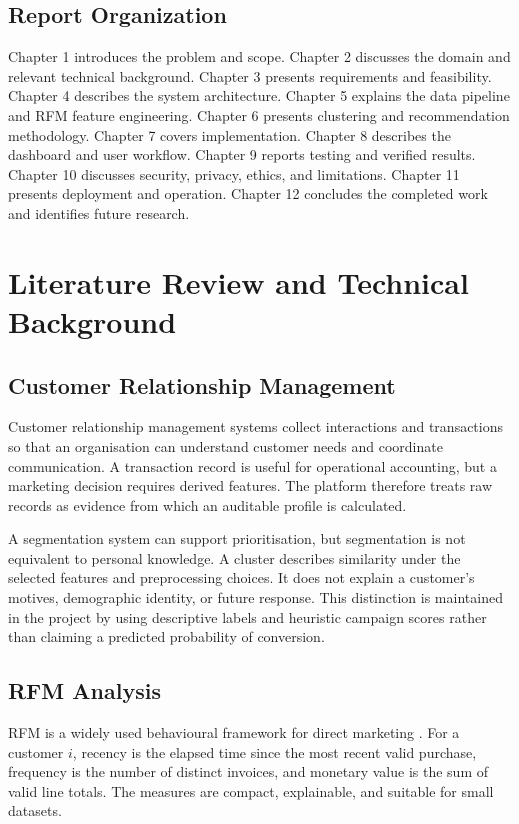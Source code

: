 \documentclass[12pt,a4paper]{report}
\begin{document}
\section{Report Organization}
Chapter 1 introduces the problem and scope. Chapter 2 discusses the domain and relevant technical background. Chapter 3 presents requirements and feasibility. Chapter 4 describes the system architecture. Chapter 5 explains the data pipeline and RFM feature engineering. Chapter 6 presents clustering and recommendation methodology. Chapter 7 covers implementation. Chapter 8 describes the dashboard and user workflow. Chapter 9 reports testing and verified results. Chapter 10 discusses security, privacy, ethics, and limitations. Chapter 11 presents deployment and operation. Chapter 12 concludes the completed work and identifies future research.

\chapter{Literature Review and Technical Background}
\section{Customer Relationship Management}
Customer relationship management systems collect interactions and transactions so that an organisation can understand customer needs and coordinate communication. A transaction record is useful for operational accounting, but a marketing decision requires derived features. The platform therefore treats raw records as evidence from which an auditable profile is calculated.

A segmentation system can support prioritisation, but segmentation is not equivalent to personal knowledge. A cluster describes similarity under the selected features and preprocessing choices. It does not explain a customer's motives, demographic identity, or future response. This distinction is maintained in the project by using descriptive labels and heuristic campaign scores rather than claiming a predicted probability of conversion.

\section{RFM Analysis}
RFM is a widely used behavioural framework for direct marketing \cite{hughes1994,chen2012}. For a customer $i$, recency is the elapsed time since the most recent valid purchase, frequency is the number of distinct invoices, and monetary value is the sum of valid line totals. The measures are compact, explainable, and suitable for small datasets.
\end{document}

